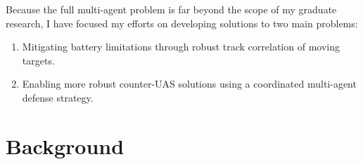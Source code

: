 Because the full multi-agent problem is far beyond the scope of my graduate research, I have focused my efforts on developing solutions to two main problems:
\begin{enumerate}
    \item Mitigating battery limitations through robust track correlation of moving targets.
    \item Enabling more robust counter-UAS solutions using a coordinated multi-agent defense strategy.
\end{enumerate}

\section{Background}
\label{sec:intro_background}
